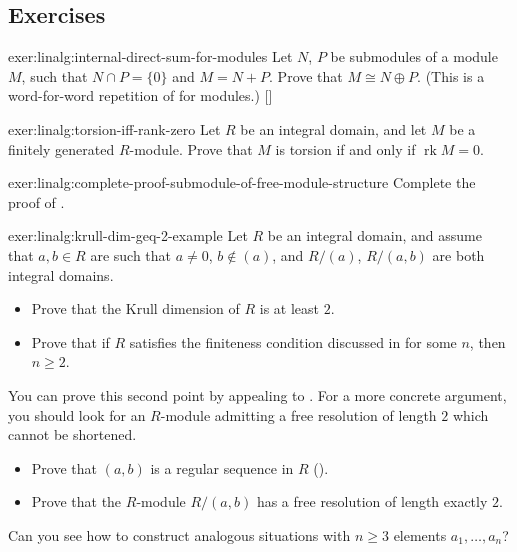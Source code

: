 \subsection*{Exercises}

\begin{exer}{\exerused}{exer:linalg:internal-direct-sum-for-modules}
  Let $N$, $P$ be submodules of a module $M$, such that
  $N \cap P = \{0\}$ and $M = N + P$. Prove that $M \cong N \oplus
  P$. (This is a word-for-word repetition of 
  for modules.) []
\end{exer}
\begin{exer}{}{exer:linalg:torsion-iff-rank-zero}
  Let $R$ be an integral domain, and let $M$ be a finitely generated
  $R$-module. Prove that $M$ is torsion if and only if
  $\operatorname{rk} M = 0$.
\end{exer}
\begin{exer}{}{exer:linalg:complete-proof-submodule-of-free-module-structure}
  Complete the proof of .
\end{exer}
\begin{exer}{}{exer:linalg:krull-dim-geq-2-example}
  Let $R$ be an integral domain, and assume that $a, b \in R$ are such
  that $a \neq 0$, $b \notin (a)$, and $R/(a)$, $R/(a,b)$ are both
  integral domains.
  \begin{itemize}
  \item Prove that the Krull dimension of $R$ is at least $2$.
  \item Prove that if $R$ satisfies the finiteness condition discussed
    in  for some $n$, then
    $n \geq 2$.
  \end{itemize}
  You can prove this second point by appealing to
  . For a more concrete argument, you should look for
  an $R$-module admitting a free resolution of length $2$ which cannot
  be shortened.
  \begin{itemize}
  \item Prove that $(a,b)$ is a regular sequence in $R$
    ().
  \item Prove that the $R$-module $R/(a,b)$ has a free resolution of
    length exactly $2$.
  \end{itemize}
  Can you see how to construct analogous situations with $n \geq 3$
  elements $a_1, \dots, a_n$?
\end{exer}

